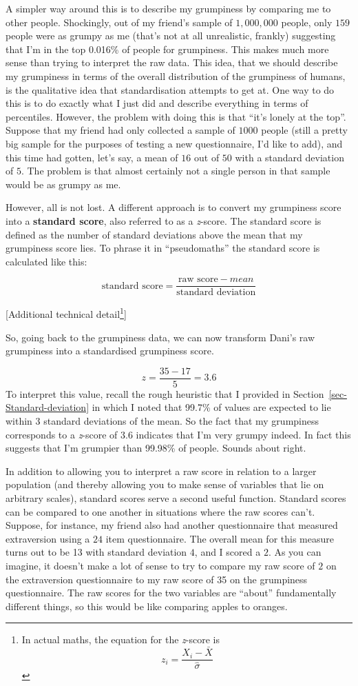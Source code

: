 \documentclass[
  a4paper,
]{book}
\begin{document}
A simpler way around this is to describe my grumpiness by comparing me
to other people. Shockingly, out of my friend's sample of \(1,000,000\)
people, only \(159\) people were as grumpy as me (that's not at all
unrealistic, frankly) suggesting that I'm in the top 0.016\% of people
for grumpiness. This makes much more sense than trying to interpret the
raw data. This idea, that we should describe my grumpiness in terms of
the overall distribution of the grumpiness of humans, is the qualitative
idea that standardisation attempts to get at. One way to do this is to
do exactly what I just did and describe everything in terms of
percentiles. However, the problem with doing this is that ``it's lonely
at the top''. Suppose that my friend had only collected a sample of
\(1000\) people (still a pretty big sample for the purposes of testing a
new questionnaire, I'd like to add), and this time had gotten, let's
say, a mean of \(16\) out of \(50\) with a standard deviation of \(5\).
The problem is that almost certainly not a single person in that sample
would be as grumpy as me.

However, all is not lost. A different approach is to convert my
grumpiness score into a \textbf{standard score}, also referred to as a
\emph{z}-score. The standard score is defined as the number of standard
deviations above the mean that my grumpiness score lies. To phrase it in
``pseudomaths'' the standard score is calculated like this:

\[
\text{standard score} = \frac{\text{raw score} - mean}{\text{standard deviation}}
\]

{[}Additional technical detail\footnote{In actual maths, the equation
  for the \emph{z}-score is \[z_i =\frac{X_i - \bar{X}}{\hat{\sigma}}\]}{]}

So, going back to the grumpiness data, we can now transform Dani's raw
grumpiness into a standardised grumpiness score.

\[ z =\frac{35 - 17}{5} = 3.6 \] To interpret this value, recall the
rough heuristic that I provided in Section~\ref{sec-Standard-deviation}
in which I noted that 99.7\% of values are expected to lie within 3
standard deviations of the mean. So the fact that my grumpiness
corresponds to a \emph{z}-score of 3.6 indicates that I'm very grumpy
indeed. In fact this suggests that I'm grumpier than 99.98\% of people.
Sounds about right.

In addition to allowing you to interpret a raw score in relation to a
larger population (and thereby allowing you to make sense of variables
that lie on arbitrary scales), standard scores serve a second useful
function. Standard scores can be compared to one another in situations
where the raw scores can't. Suppose, for instance, my friend also had
another questionnaire that measured extraversion using a \(24\) item
questionnaire. The overall mean for this measure turns out to be 13 with
standard deviation \(4\), and I scored a \(2\). As you can imagine, it
doesn't make a lot of sense to try to compare my raw score of \(2\) on
the extraversion questionnaire to my raw score of 35 on the grumpiness
questionnaire. The raw scores for the two variables are ``about''
fundamentally different things, so this would be like comparing apples
to oranges.
\end{document}
